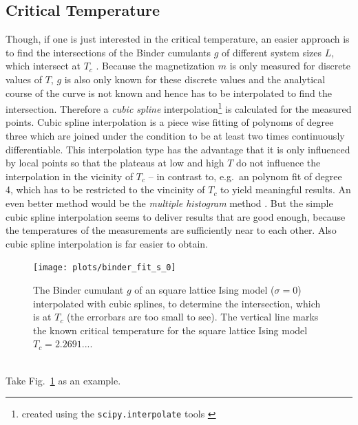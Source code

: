 \subsection{Critical Temperature}
\label{ssec:binderIntersections}
    Though, if one is just interested in the critical temperature, an
    easier approach is to find the intersections of the Binder cumulants
    \(g\) of different system sizes \(L\), which intersect at \(T_c\) \cite{Binder1981}.
    Because the magnetization \(m\) is only measured for discrete values
    of \(T\), \(g\) is also only known for these discrete values and the
    analytical course of the curve is not known and hence has
    to be interpolated to find the intersection. Therefore a \emph{cubic spline}
    interpolation\footnote{created using the \texttt{scipy.interpolate} tools \cite{scipy2001}}
    is calculated for the measured points.
    Cubic spline interpolation is a piece wise fitting of polynoms of
    degree three which are joined under the condition to be at least two
    times continuously differentiable. This interpolation type has the
    advantage that it is only influenced by local points so that the
    plateaus at low and high \(T\) do not influence the interpolation in
    the vicinity of \(T_c\) -- in contrast to, e.g.\ an polynom fit of
    degree 4, which has to be restricted to the vincinity of \(T_c\) to
    yield meaningful results. An even better method would be the
    \emph{multiple histogram} method \cite[p. 219ff]{NewmanBarkema1999}.
    But the simple cubic spline interpolation seems to deliver results
    that are good enough, because the temperatures of the measurements are
    sufficiently near to each other. Also cubic spline interpolation is
    far easier to obtain.
    \begin{figure}[htbp]
        \centering
        \texttt{[image: plots/binder\_fit\_s\_0]}
        \caption[Example of a Binder Cumulant to Determine the Critical Temperature]
        {
            The Binder cumulant \(g\) of an square lattice Ising model
            (\(\sigma=0\)) interpolated with cubic splines, to determine
            the intersection, which is at \(T_c\)
            (the errorbars are too small to see).
            The vertical line marks the known critical temperature for the
            square lattice Ising model \(T_{c} = 2.2691...\).
        }
        \label{fig:gettingCrit:binder_fit_s_0}
    \end{figure}\\
    Take Fig.\ \ref{fig:gettingCrit:binder_fit_s_0} as an example.
